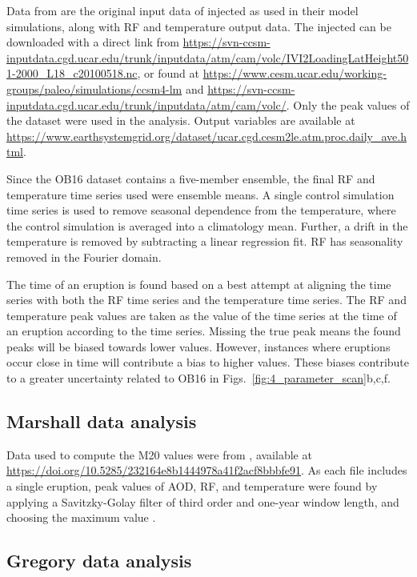 \documentclass[draft]{agujournal2019}
\newcommand{\iso}[1][i]{{#1}njected \ce{SO2}}
\begin{document}
Data from  are the original input data of \iso{} as used in
their model simulations, along with RF and temperature output data. The \iso{} can be
downloaded with a direct link from
\url{https://svn-ccsm-inputdata.cgd.ucar.edu/trunk/inputdata/atm/cam/volc/IVI2LoadingLatHeight501-2000_L18_c20100518.nc},
or found at \url{https://www.cesm.ucar.edu/working-groups/paleo/simulations/ccsm4-lm}
and \url{https://svn-ccsm-inputdata.cgd.ucar.edu/trunk/inputdata/atm/cam/volc/}. Only
the peak values of the  dataset were used in the analysis. Output variables are
available at
\url{https://www.earthsystemgrid.org/dataset/ucar.cgd.cesm2le.atm.proc.daily_ave.html}.

Since the OB16 dataset contains a five-member ensemble, the final RF and temperature
time series used were ensemble means. A single control simulation time series is used to
remove seasonal dependence from the temperature, where the control simulation is
averaged into a climatology mean. Further, a drift in the temperature is removed by
subtracting a linear regression fit. RF has seasonality removed in the Fourier domain.

The time of an eruption is found based on a best attempt at aligning the  time
series with both the RF time series and the temperature time series. The RF and
temperature peak values are taken as the value of the time series at the time of an
eruption according to the  time series. Missing the true peak means the found
peaks will be biased towards lower values. However, instances where eruptions occur
close in time will contribute a bias to higher values. These biases contribute to a
greater uncertainty related to OB16 in Figs.~\ref{fig:4_parameter_scan}b,c,f.

\subsection{Marshall data analysis}\label{ap:m20}

Data used to compute the M20 values were from , available at
\url{https://doi.org/10.5285/232164e8b1444978a41f2acf8bbbfe91}. As each file includes a
single eruption, peak values of AOD, RF, and temperature were found by applying a
Savitzky-Golay filter of third order and one-year window length, and choosing the
maximum value \cite{savitzky1964}.

\subsection{Gregory data analysis}\label{ap:g16}
\end{document}
